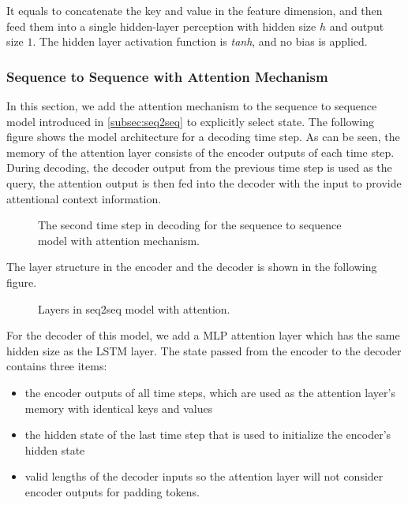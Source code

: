 It equals to concatenate the key and value in the feature dimension, and then feed them into a single hidden-layer perception with hidden size $h$ and output size $1$. The hidden layer activation function is \textit{tanh}, and no bias is applied.

\subsubsection{Sequence to Sequence with Attention Mechanism}

In this section, we add the attention mechanism to the sequence to sequence model introduced in \cref{subsec:seq2seq} to explicitly select state. The following figure shows the model architecture for a decoding time step. As can be seen, the memory of the attention layer consists of the encoder outputs of each time step. During decoding, the decoder output from the previous time step is used as the query, the attention output is then fed into the decoder with the input to provide attentional context information.

\begin{figure}[hpt]
	\centering
	
	\caption{The second time step in decoding for the sequence to sequence model with attention mechanism.}
	\label{fig:seq2seq_attention}
\end{figure}

The layer structure in the encoder and the decoder is shown in the following figure.

\begin{figure}[hpt]
	\centering
	
	\caption{Layers in seq2seq model with attention.}
	\label{fig:seq2seq-attention-details}
\end{figure}

For the decoder of this model, we add a MLP attention layer which has the same hidden size as the LSTM layer. The state passed from the encoder to the decoder contains three items:

\begin{itemize}
    \item the encoder outputs of all time steps, which are used as the attention layer's memory with identical keys and values
    \item the hidden state of the last time step that is used to initialize the encoder's hidden state  
    \item valid lengths of the decoder inputs so the attention layer will not consider encoder outputs for padding tokens.
\end{itemize}

